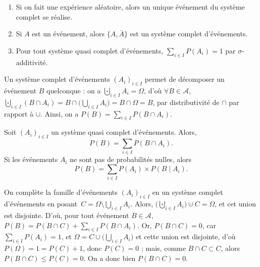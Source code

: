 \begin{rmk}
	\begin{enumerate}
		\item Si on fait une expérience aléatoire, alors un unique événement du système complet se réalise.
		\item Si $A$ est un événement, alors $\{A,\bar{A}\}$\/ est un système complet d'événements.
		\item Pour tout système quasi complet d'événements, $\sum_{i \in I} P(A_i) = 1$\/ par $\sigma$-additivité.
	\end{enumerate}
\end{rmk}

\begin{met}
	Un système complet d'événements $(A_i)_{i\in I}$\/ permet de décomposer un événement $B$\/ quelconque : on a $\bigcupdot_{i \in I} A_i = \Omega$, d'où $\forall B \in \mathcal{A}$, $\bigcupdot_{i \in  I} (B \cap A_i) = B \cap \big(\bigcup_{i \in I} A_i\big) = B \cap \Omega = B$, par distributivité de $\cap$\/ par rapport à $\cup$. Ainsi, on a $P(B) = \sum_{i \in I}P(B \cap A_i)$.
\end{met}

\begin{thm}
	Soit $(A_i)_{i\in I}$\/ un système quasi complet d'événements. Alors, \[
		P(B) = \sum_{i \in I} P(B \cap A_i)
	.\]
	Si les événements $A_i$\/ ne sont pas de probabilités nulles, alors \[
		P(B) = \sum_{i \in I} P(A_i) \times P(B  \mid A_i)
	.\]
\end{thm}

\begin{prv}
	On complète la famille d'événements $(A_i)_{i\in I}$\/ en un système complet d'événements en posant~$C = \Omega \setminus \bigcup_{i \in I} A_i$.
	Alors, $\big(\bigcupdot_{i \in I} A_i \big) \cupdot C = \Omega$, et cet union est disjointe. D'où, pour tout événement $B \in \mathcal{A}$, $P(B) = P(B \cap C) + \sum_{i \in I} P(B \cap A_i)$. Or, $P(B \cap C) = 0$, car $\sum_{i \in I}P(A_i) = 1$, et $\Omega = C \cup \big(\bigcup_{i \in  I} A_i\big)$ et cette union est disjointe, d'où $P(\Omega) = 1 = P(C) + 1$, donc $P(C) = 0$\/ ; mais, comme $B \cap C \subset C$, alors $P(B \cap C) \le P(C) = 0$. On a donc bien $P(B \cap C) = 0$.
\end{prv}

